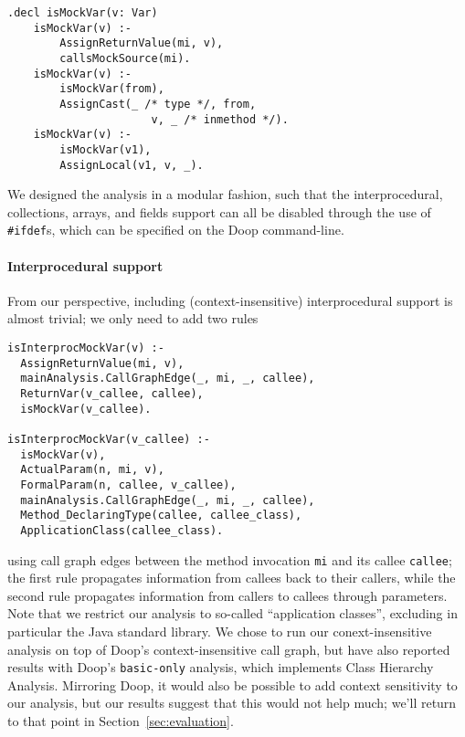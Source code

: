 \begin{lstlisting}[basicstyle=\ttfamily\small,numbers=none,label={lst:core},caption={Core rules for propagating mockness via predicate {\tt isMockVar}.}]
    .decl isMockVar(v: Var)
    isMockVar(v) :-
        AssignReturnValue(mi, v),
        callsMockSource(mi).
    isMockVar(v) :-
        isMockVar(from),
        AssignCast(_ /* type */, from,
                      v, _ /* inmethod */).
    isMockVar(v) :-
        isMockVar(v1),
        AssignLocal(v1, v, _).
\end{lstlisting}

We designed the analysis in a modular fashion, such that the interprocedural, collections, arrays, and fields support can all be disabled through the use of \verb+#ifdef+s, which can be specified on the Doop command-line.

\paragraph{Interprocedural support} From our perspective, including (context-insensitive) interprocedural support is almost trivial; we only need to add two rules
\begin{lstlisting}[basicstyle=\ttfamily\small,numbers=none]
isInterprocMockVar(v) :-
  AssignReturnValue(mi, v),
  mainAnalysis.CallGraphEdge(_, mi, _, callee),
  ReturnVar(v_callee, callee),
  isMockVar(v_callee).

isInterprocMockVar(v_callee) :-
  isMockVar(v),
  ActualParam(n, mi, v),
  FormalParam(n, callee, v_callee),
  mainAnalysis.CallGraphEdge(_, mi, _, callee),
  Method_DeclaringType(callee, callee_class),
  ApplicationClass(callee_class).
\end{lstlisting}
using call graph edges between the method invocation {\tt mi} and its callee {\tt callee}; the first rule propagates information from callees back to their callers, while the second rule propagates information from callers to callees through parameters. Note that we restrict our analysis to so-called ``application classes'', excluding in particular the Java standard library. We chose to run our conext-insensitive analysis on top of Doop's context-insensitive call graph, but have also reported results with Doop's \texttt{basic-only} analysis, which implements Class Hierarchy Analysis. Mirroring Doop, it would also be possible to add context sensitivity to our analysis, but our results suggest that this would not help much; we'll return to that point in Section~\ref{sec:evaluation}.

